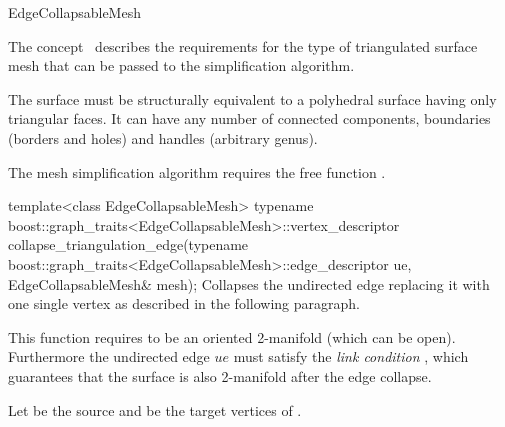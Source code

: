 
\begin{ccRefConcept}{EdgeCollapsableMesh}


\ccDefinition

The concept \ccRefName\ describes the requirements for the type of 
triangulated surface mesh that can be passed to the
simplification algorithm.

The surface must be structurally equivalent to a polyhedral surface
having only triangular faces. 
It can have any number of connected components, boundaries 
(borders and holes) and handles (arbitrary genus).

\ccRefines
{}


The mesh simplification algorithm requires the free function .


  \ccFunction
  {template<class EdgeCollapsableMesh>
  typename boost::graph_traits<EdgeCollapsableMesh>::vertex_descriptor
  collapse_triangulation_edge(typename boost::graph_traits<EdgeCollapsableMesh>::edge_descriptor ue,
                             EdgeCollapsableMesh& mesh);}  
  {Collapses the undirected edge  replacing it with one single vertex as described in 
   the following paragraph.}

    

\ccPrecond This function requires  to be an oriented 2-manifold (which can be open). Furthermore
the undirected edge $ue$ must satisfy the {\em link condition} \cite{degn-tpec-98},
which guarantees that the surface is also 2-manifold after the edge collapse. 

\smallskip
Let  be the source and  be the target vertices of .


\end{ccRefConcept}
